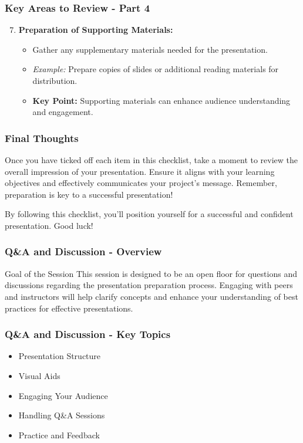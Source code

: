 \documentclass[aspectratio=169]{beamer}
\begin{document}
\begin{frame}[fragile]
    \frametitle{Key Areas to Review - Part 4}
    \begin{enumerate}
        \setcounter{enumi}{6}
        \item \textbf{Preparation of Supporting Materials:}
        \begin{itemize}
            \item Gather any supplementary materials needed for the presentation.
            \item \textit{Example:} Prepare copies of slides or additional reading materials for distribution.
            \item \textbf{Key Point:} Supporting materials can enhance audience understanding and engagement.
        \end{itemize}
    \end{enumerate}
\end{frame}

\begin{frame}[fragile]
    \frametitle{Final Thoughts}
    Once you have ticked off each item in this checklist, take a moment to review the overall impression of your presentation. Ensure it aligns with your learning objectives and effectively communicates your project’s message. Remember, preparation is key to a successful presentation!

    By following this checklist, you’ll position yourself for a successful and confident presentation. Good luck!
\end{frame}

\begin{frame}[fragile]
    \frametitle{Q\&A and Discussion - Overview}
    \begin{block}{Goal of the Session}
        This session is designed to be an open floor for questions and discussions regarding the presentation preparation process. Engaging with peers and instructors will help clarify concepts and enhance your understanding of best practices for effective presentations.
    \end{block}
\end{frame}

\begin{frame}[fragile]
    \frametitle{Q\&A and Discussion - Key Topics}
    \begin{itemize}
        \item Presentation Structure
        \item Visual Aids
        \item Engaging Your Audience
        \item Handling Q\&A Sessions
        \item Practice and Feedback
    \end{itemize}
\end{frame}
\end{document}
